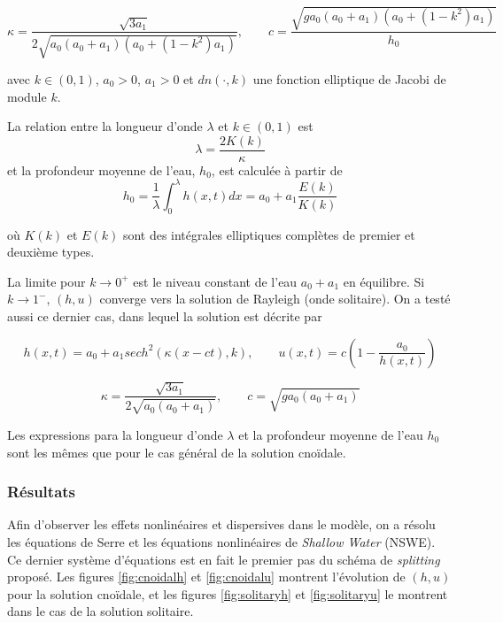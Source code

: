 \begin{equation*}
    \kappa = \frac{\sqrt{3a_1}}{2\sqrt{a_0(a_0+a_1)(a_0+(1-k^2)a_1)}}, \qquad
    c = \frac{\sqrt{g a_0(a_0+a_1)(a_0+(1-k^2)a_1)}}{h_0}
\end{equation*}

\noindent avec $k\in(0,1)$, $a_0>0$, $a_1>0$ et $dn(\cdot,k)$ une fonction elliptique de Jacobi de module $k$.

\indent La relation entre la longueur d'onde $\lambda$ et $k\in(0,1)$ est $$\lambda = \frac{2K(k)}{\kappa}$$ et la profondeur moyenne de l'eau, $h_0$, est calculée à partir de $$h_0 = \frac{1}{\lambda}\int_{0}^\lambda h(x,t)dx = a_0 + a_1 \frac{E(k)}{K(k)}$$

\noindent où $K(k)$ et $E(k)$ sont des intégrales elliptiques complètes de premier et deuxième types. 

\indent La limite pour $k\to0^+$ est le niveau constant de l'eau $a_0+a_1$ en équilibre. Si $k\to1^-$, $(h,u)$ converge vers la solution de Rayleigh (onde solitaire). On a testé aussi ce dernier cas, dans lequel la solution est décrite par \cite{CarterCienfuegos2011}

\begin{equation*}
    h(x,t) = a_0 + a_1 sech^2(\kappa(x-ct),k), \qquad
    u(x,t) = c\left( 1 - \frac{a_0}{h(x,t)}\right)
\end{equation*}

\begin{equation*}
    \kappa = \frac{\sqrt{3a_1}}{2\sqrt{a_0(a_0+a_1)}}, \qquad
    c = \sqrt{g a_0(a_0+a_1)}
\end{equation*}

\indent Les expressions para la longueur d'onde $\lambda$ et la profondeur moyenne de l'eau $h_0$ sont les mêmes que pour le cas général de la solution cnoïdale.

\subsubsection{Résultats}

\indent Afin d'observer les effets nonlinéaires et dispersives dans le modèle, on a résolu les équations de Serre et les équations nonlinéaires de \emph{Shallow Water} (NSWE). Ce dernier système d'équations est en fait le premier pas du schéma de \emph{splitting} proposé. Les figures \ref{fig:cnoidalh} et \ref{fig:cnoidalu} montrent l'évolution de $(h,u)$ pour la solution cnoïdale, et les figures  \ref{fig:solitaryh} et \ref{fig:solitaryu} le montrent dans le cas de la solution solitaire. 

